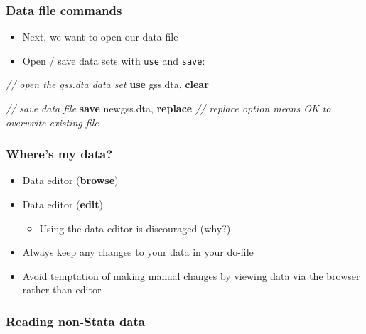 \documentclass[
]{book}
\newenvironment{Shaded}{\begin{snugshade}}{\end{snugshade}}
\newcommand{\CommentTok}[1]{\textcolor[rgb]{0.56,0.35,0.01}{\textit{#1}}}
\newcommand{\KeywordTok}[1]{\textcolor[rgb]{0.13,0.29,0.53}{\textbf{#1}}}
\newcommand{\NormalTok}[1]{#1}
\providecommand{\tightlist}{%
  \setlength{\itemsep}{0pt}\setlength{\parskip}{0pt}}
\begin{document}
\hypertarget{data-file-commands}{%
\subsubsection{Data file commands}\label{data-file-commands}}

\begin{itemize}
\tightlist
\item
  Next, we want to open our data file
\item
  Open / save data sets with \texttt{use} and \texttt{save}:
\end{itemize}

\begin{Shaded}
\begin{Highlighting}[]
\CommentTok{// open the gss.dta data set }
\KeywordTok{use}\NormalTok{ gss.dta, }\KeywordTok{clear}

\CommentTok{// save data file}
\KeywordTok{save}\NormalTok{ newgss.dta, }\KeywordTok{replace} \CommentTok{// \textasciigrave{}replace\textasciigrave{} option means OK to overwrite existing file}
\end{Highlighting}
\end{Shaded}

\hypertarget{wheres-my-data}{%
\subsubsection{Where's my data?}\label{wheres-my-data}}

\begin{itemize}
\tightlist
\item
  Data editor (\textbf{browse})
\item
  Data editor (\textbf{edit})

  \begin{itemize}
  \tightlist
  \item
    Using the data editor is discouraged (why?)
  \end{itemize}
\item
  Always keep any changes to your data in your do-file
\item
  Avoid temptation of making manual changes by viewing data via the browser rather than editor
\end{itemize}

\hypertarget{reading-non-stata-data}{%
\subsubsection{Reading non-Stata data}\label{reading-non-stata-data}}
\end{document}
